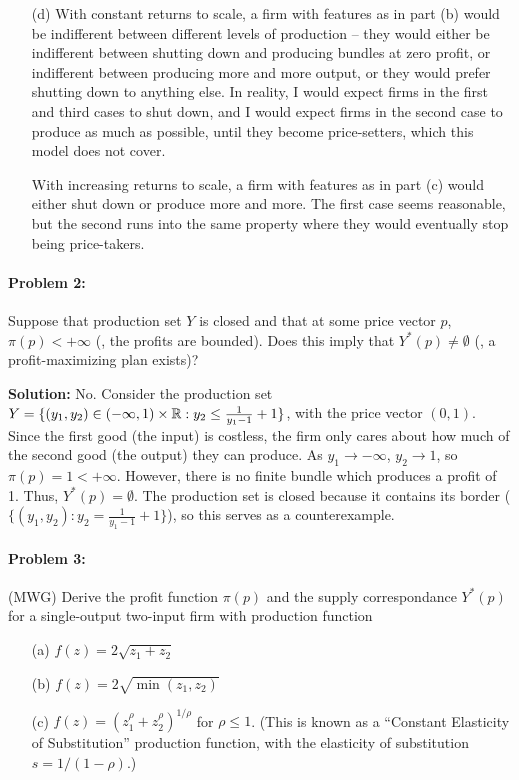 \documentclass[12pt]{article}
\begin{document}
\begin{itemize}
    \item[(d)] With constant returns to scale, a firm with features as in part (b) would be indifferent between different levels of production -- they would either be indifferent between shutting down and producing bundles at zero profit, or indifferent between producing more and more output, or they would prefer shutting down to anything else. In reality, I would expect firms in the first and third cases to shut down, and I would expect firms in the second case to produce as much as possible, until they become price-setters, which this model does not cover.

    With increasing returns to scale, a firm with features as in part (c) would either shut down or produce more and more. The first case seems reasonable, but the second runs into the same property where they would eventually stop being price-takers.
\end{itemize}

\paragraph{Problem 2:} Suppose that production set $Y$ is closed and that at some price vector $p$, $\pi(p) < +\infty$ (\ie, the profits are bounded). Does this imply that $Y^*(p) \ne \emptyset$ (\ie, a profit-maximizing plan exists)?

\textbf{Solution:} No. Consider the production set $Y = \{(y_1,y_2) \in (-\infty,1) \times \mathbb{R} : y_2 \le \frac{1}{y_1 - 1} + 1\}$, with the price vector $(0,1)$. Since the first good (the input) is costless, the firm only cares about how much of the second good (the output) they can produce. As $y_1 \to -\infty$, $y_2 \to 1$, so $\pi(p) = 1 < +\infty$. However, there is no finite bundle which produces a profit of 1. Thus, $Y^*(p) = \emptyset$. The production set is closed because it contains its border ($\{(y_1,y_2) : y_2 = \frac{1}{y_1 - 1} + 1\}$), so this serves as a counterexample.

\paragraph{Problem 3:} (MWG) Derive the profit function $\pi(p)$ and the supply correspondance $Y^*(p)$ for a single-output two-input firm with production function

\begin{itemize}
    \item[(a)] $f(z) = 2\sqrt{z_1 + z_2}$

    \item[(b)] $f(z) = 2\sqrt{\min(z_1,z_2)}$

    \item[(c)] $f(z) = (z_1^\rho + z_2^\rho)^{1/\rho}$ for $\rho \le 1$. (This is known as a ``Constant Elasticity of Substitution'' production function, with the elasticity of substitution $s = 1 / (1-\rho)$.)
\end{itemize}
\end{document}
